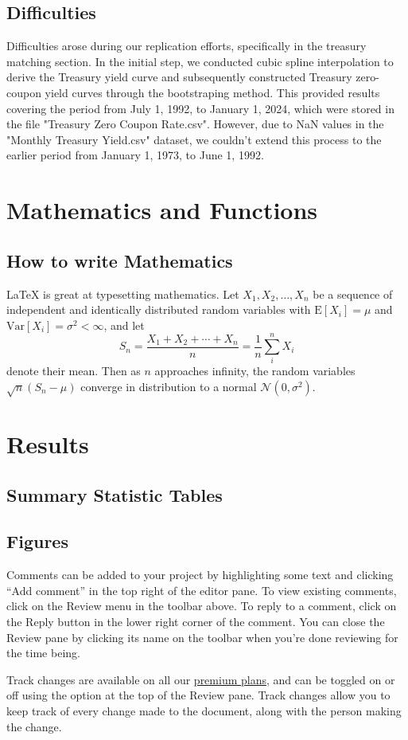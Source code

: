 \documentclass{article}
\begin{document}
\subsection{Difficulties}

Difficulties arose during our replication efforts, specifically in the treasury matching section. In the initial step, we conducted cubic spline interpolation to derive the Treasury yield curve and subsequently constructed Treasury zero-coupon yield curves through the bootstraping method. This provided results covering the period from July 1, 1992, to January 1, 2024, which were stored in the file "Treasury Zero Coupon Rate.csv". However, due to NaN values in the "Monthly Treasury Yield.csv" dataset, we couldn't extend this process to the earlier period from January 1, 1973, to June 1, 1992. 

\section{ Mathematics and Functions}

\subsection{How to write Mathematics}

\LaTeX{} is great at typesetting mathematics. Let $X_1, X_2, \ldots, X_n$ be a sequence of independent and identically distributed random variables with $\text{E}[X_i] = \mu$ and $\text{Var}[X_i] = \sigma^2 < \infty$, and let
\[S_n = \frac{X_1 + X_2 + \cdots + X_n}{n}
      = \frac{1}{n}\sum_{i}^{n} X_i\]
denote their mean. Then as $n$ approaches infinity, the random variables $\sqrt{n}(S_n - \mu)$ converge in distribution to a normal $\mathcal{N}(0, \sigma^2)$.


\section{ Results}

\subsection{Summary Statistic Tables}


\subsection{Figures}

Comments can be added to your project by highlighting some text and clicking ``Add comment'' in the top right of the editor pane. To view existing comments, click on the Review menu in the toolbar above. To reply to a comment, click on the Reply button in the lower right corner of the comment. You can close the Review pane by clicking its name on the toolbar when you're done reviewing for the time being.

Track changes are available on all our \href{https://www.overleaf.com/user/subscription/plans}{premium plans}, and can be toggled on or off using the option at the top of the Review pane. Track changes allow you to keep track of every change made to the document, along with the person making the change. 




\end{document}

